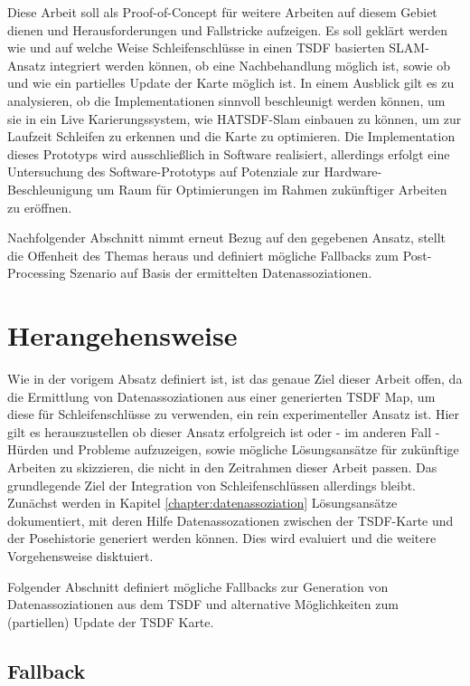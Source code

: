 Diese Arbeit soll als Proof-of-Concept für weitere Arbeiten auf diesem Gebiet dienen und Herausforderungen und Fallstricke aufzeigen. Es soll geklärt werden wie und auf welche Weise Schleifenschlüsse in einen TSDF basierten SLAM-Ansatz integriert werden können, ob eine Nachbehandlung möglich ist, sowie ob und wie ein partielles Update der Karte möglich ist.
In einem Ausblick gilt es zu analysieren, ob die Implementationen sinnvoll beschleunigt werden können, um sie in ein Live Karierungssystem, wie HATSDF-Slam einbauen zu können, um zur Laufzeit Schleifen zu erkennen und die Karte zu optimieren.
Die Implementation dieses Prototyps wird ausschließlich in Software realisiert, allerdings erfolgt eine Untersuchung des Software-Prototyps auf Potenziale zur Hardware-Beschleunigung um Raum für Optimierungen im Rahmen zukünftiger Arbeiten zu eröffnen.

Nachfolgender Abschnitt nimmt erneut Bezug auf den gegebenen Ansatz, stellt die Offenheit des Themas heraus und definiert mögliche Fallbacks zum Post-Processing Szenario auf Basis der ermittelten Datenassoziationen.

\section{Herangehensweise}
\label{section:herangehensweise}

Wie in der vorigem Absatz definiert ist, ist das genaue Ziel dieser Arbeit offen, da die Ermittlung von Datenassoziationen aus einer generierten TSDF Map, um diese für Schleifenschlüsse zu verwenden, ein rein experimenteller Ansatz ist.
Hier gilt es herauszustellen ob dieser Ansatz erfolgreich ist oder - im anderen Fall - Hürden und Probleme aufzuzeigen, sowie mögliche Lösungsansätze für zukünftige Arbeiten zu skizzieren, die nicht in den Zeitrahmen dieser Arbeit passen.
Das grundlegende Ziel der Integration von Schleifenschlüssen allerdings bleibt.
Zunächst werden in Kapitel \ref{chapter:datenassoziation} Lösungsansätze dokumentiert, mit deren Hilfe Datenassozationen zwischen der TSDF-Karte und der Posehistorie generiert werden können. Dies wird evaluiert und die weitere Vorgehensweise disktuiert.

Folgender Abschnitt definiert mögliche Fallbacks zur Generation von Datenassoziationen aus dem TSDF und alternative Möglichkeiten zum (partiellen) Update der TSDF Karte.

\subsection{Fallback}
\label{section:fallback}

